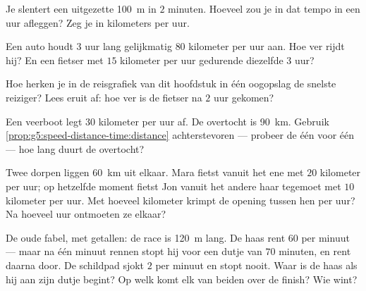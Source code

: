 \begin{exercise}[$\star$]\label{exo:g5:speed-distance-time:6}
Je slentert een uitgezette \qty{100}{m} in $2$ minuten. Hoeveel
 zou je in dat tempo in een uur afleggen? Zeg je  in
kilometers per uur.
\end{exercise}

\begin{exercise}[$\star$]\label{exo:g5:speed-distance-time:7}
Een auto houdt $3$ uur lang gelijkmatig $80$ kilometer per uur aan.
Hoe ver rijdt hij? En een fietser met $15$ kilometer per uur gedurende
diezelfde $3$ uur?
\end{exercise}

\begin{exercise}[$\star$]\label{exo:g5:speed-distance-time:8}
Hoe herken je in de reisgrafiek van dit hoofdstuk in één oogopslag de
snelste reiziger? Lees eruit af: hoe ver is de fietser na $2$
uur gekomen?
\end{exercise}

\begin{exercise}[$\star\star$]\label{exo:g5:speed-distance-time:9}
Een veerboot legt $30$ kilometer per uur af. De overtocht is
\qty{90}{km}. Gebruik \cref{prop:g5:speed-distance-time:distance}
achterstevoren --- probeer de  één voor één --- hoe lang duurt de
overtocht?
\end{exercise}

\begin{exercise}[$\star\star$]\label{exo:g5:speed-distance-time:10}
Twee dorpen liggen \qty{60}{km} uit elkaar. Mara fietst vanuit het ene
met $20$ kilometer per uur; op hetzelfde moment fietst Jon vanuit het
andere haar tegemoet met $10$ kilometer per uur. Met hoeveel kilometer
krimpt de opening tussen hen per uur? Na hoeveel uur ontmoeten ze
elkaar?
\end{exercise}

\begin{exercise}[$\star\star$]\label{exo:g5:speed-distance-time:11}
De oude fabel, met getallen: de race is \qty{120}{m} lang. De haas
rent $60$  per minuut --- maar na één minuut rennen stopt hij
voor een dutje van $70$ minuten, en rent daarna door. De schildpad
sjokt $2$  per minuut en stopt nooit. Waar is de haas als hij
aan zijn dutje begint? Op welk  komt elk van beiden over de
finish? Wie wint?
\end{exercise}
